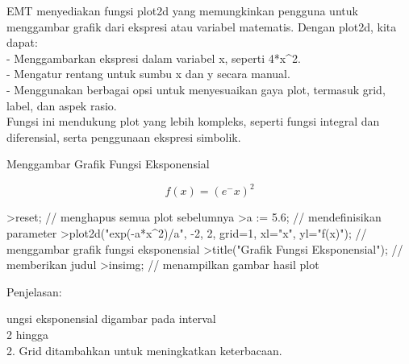 \documentclass{article}
\begin{document}
\begin{eulernotebook}
\begin{eulercomment}
\begin{eulercomment}
\begin{eulercomment}
\begin{eulercomment}
\begin{eulercomment}
\begin{eulercomment}
\begin{eulercomment}
\begin{eulercomment}
\begin{eulercomment}
\begin{eulercomment}
\begin{eulercomment}
EMT menyediakan fungsi plot2d yang memungkinkan pengguna untuk
menggambar grafik dari ekspresi atau variabel matematis. Dengan
plot2d, kita dapat:\\
- Menggambarkan ekspresi dalam variabel x, seperti 4*x\textasciicircum{}2.\\
- Mengatur rentang untuk sumbu x dan y secara manual.\\
- Menggunakan berbagai opsi untuk menyesuaikan gaya plot, termasuk
grid, label, dan aspek rasio.\\
Fungsi ini mendukung plot yang lebih kompleks, seperti fungsi integral
dan diferensial, serta penggunaan ekspresi simbolik.

\end{eulercomment}
\eulersubheading{}
\begin{eulercomment}
Menggambar Grafik Fungsi Eksponensial\\
\end{eulercomment}
\begin{eulerformula}
\[
f(x)=(e^-x)^2
\]
\end{eulerformula}
\begin{eulercomment}
\end{eulercomment}
\begin{eulerprompt}
>reset; // menghapus semua plot sebelumnya
>a := 5.6; // mendefinisikan parameter
>plot2d("exp(-a*x^2)/a", -2, 2, grid=1, xl="x", yl="f(x)"); // menggambar grafik fungsi eksponensial
>title("Grafik Fungsi Eksponensial"); // memberikan judul
>insimg; // menampilkan gambar hasil plot
\end{eulerprompt}
\begin{eulercomment}
Penjelasan:

ungsi eksponensial digambar pada interval\\
2 hingga\\
2. Grid ditambahkan untuk meningkatkan keterbacaan.


\end{eulercomment}
\end{eulercomment}
\end{eulercomment}
\end{eulercomment}
\end{eulercomment}
\end{eulercomment}
\end{eulercomment}
\end{eulercomment}
\end{eulercomment}
\end{eulercomment}
\end{eulercomment}
\end{eulernotebook}
\end{document}
